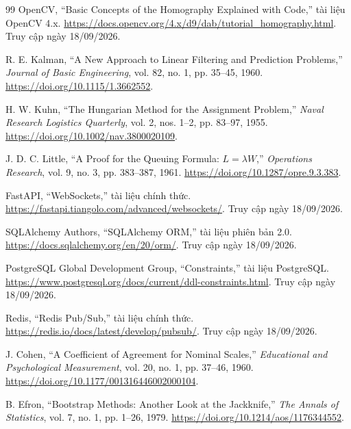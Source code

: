 \begin{thebibliography}{99}
 OpenCV, ``Basic Concepts of the Homography Explained with Code,'' tài liệu OpenCV 4.x. \url{https://docs.opencv.org/4.x/d9/dab/tutorial_homography.html}. Truy cập ngày 18/09/2026.

 R. E. Kalman, ``A New Approach to Linear Filtering and Prediction Problems,'' \textit{Journal of Basic Engineering}, vol. 82, no. 1, pp. 35--45, 1960. \url{https://doi.org/10.1115/1.3662552}.

 H. W. Kuhn, ``The Hungarian Method for the Assignment Problem,'' \textit{Naval Research Logistics Quarterly}, vol. 2, nos. 1--2, pp. 83--97, 1955. \url{https://doi.org/10.1002/nav.3800020109}.

 J. D. C. Little, ``A Proof for the Queuing Formula: $L=\lambda W$,'' \textit{Operations Research}, vol. 9, no. 3, pp. 383--387, 1961. \url{https://doi.org/10.1287/opre.9.3.383}.

 FastAPI, ``WebSockets,'' tài liệu chính thức. \url{https://fastapi.tiangolo.com/advanced/websockets/}. Truy cập ngày 18/09/2026.

 SQLAlchemy Authors, ``SQLAlchemy ORM,'' tài liệu phiên bản 2.0. \url{https://docs.sqlalchemy.org/en/20/orm/}. Truy cập ngày 18/09/2026.

 PostgreSQL Global Development Group, ``Constraints,'' tài liệu PostgreSQL. \url{https://www.postgresql.org/docs/current/ddl-constraints.html}. Truy cập ngày 18/09/2026.

 Redis, ``Redis Pub/Sub,'' tài liệu chính thức. \url{https://redis.io/docs/latest/develop/pubsub/}. Truy cập ngày 18/09/2026.

 J. Cohen, ``A Coefficient of Agreement for Nominal Scales,'' \textit{Educational and Psychological Measurement}, vol. 20, no. 1, pp. 37--46, 1960. \url{https://doi.org/10.1177/001316446002000104}.

 B. Efron, ``Bootstrap Methods: Another Look at the Jackknife,'' \textit{The Annals of Statistics}, vol. 7, no. 1, pp. 1--26, 1979. \url{https://doi.org/10.1214/aos/1176344552}.

\end{thebibliography}
